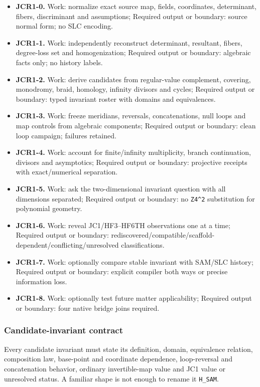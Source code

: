 \begin{itemize}
\tightlist
\item
  \textbf{JCR1-0.} Work: normalize exact source map, fields,
  coordinates, determinant, fibers, discriminant and assumptions;
  Required output or boundary: source normal form; no SLC encoding.
\item
  \textbf{JCR1-1.} Work: independently reconstruct determinant,
  resultant, fibers, degree-loss set and homogenization; Required output
  or boundary: algebraic facts only; no history labels.
\item
  \textbf{JCR1-2.} Work: derive candidates from regular-value
  complement, covering, monodromy, braid, homology, infinity divisors
  and cycles; Required output or boundary: typed invariant roster with
  domains and equivalences.
\item
  \textbf{JCR1-3.} Work: freeze meridians, reversals, concatenations,
  null loops and map controls from algebraic components; Required output
  or boundary: clean loop campaign; failures retained.
\item
  \textbf{JCR1-4.} Work: account for finite/infinity multiplicity,
  branch continuation, divisors and asymptotics; Required output or
  boundary: projective receipts with exact/numerical separation.
\item
  \textbf{JCR1-5.} Work: ask the two-dimensional invariant question with
  all dimensions separated; Required output or boundary: no
  \texttt{Z4\^{}2} substitution for polynomial geometry.
\item
  \textbf{JCR1-6.} Work: reveal JC1/HF3--HF6TH observations one at a
  time; Required output or boundary:
  rediscovered/compatible/scaffold-dependent/conflicting/unresolved
  classifications.
\item
  \textbf{JCR1-7.} Work: optionally compare stable invariant with
  SAM/SLC history; Required output or boundary: explicit compiler both
  ways or precise information loss.
\item
  \textbf{JCR1-8.} Work: optionally test future matter applicability;
  Required output or boundary: four native bridge joins required.
\end{itemize}

\subsubsection{Candidate-invariant
contract}\label{viii-ch11-candidate-invariant-contract}

Every candidate invariant must state its definition, domain, equivalence
relation, composition law, base-point and coordinate dependence,
loop-reversal and concatenation behavior, ordinary invertible-map value
and JC1 value or unresolved status. A familiar shape is not enough to
rename it \texttt{H\_SAM}.

